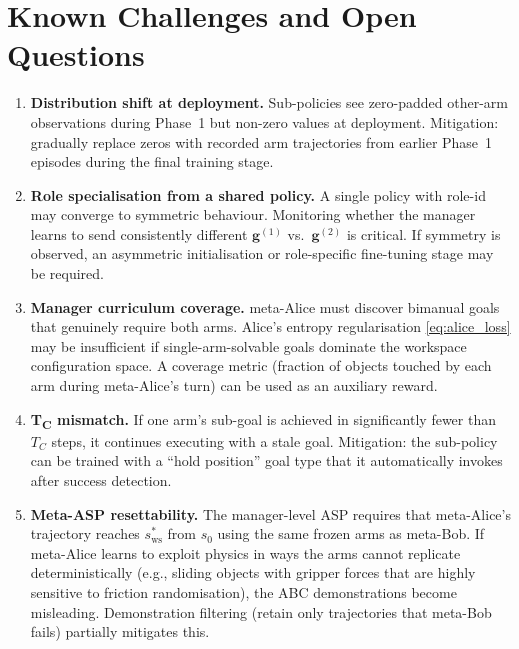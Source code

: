 \documentclass[12pt, a4paper]{article}
\newcommand{\sstar}{s^{*}}
\newcommand{\goalvec}{\mathbf{g}}
\begin{document}
\section{Known Challenges and Open Questions}
\label{sec:challenges}

\begin{enumerate}
    \item \textbf{Distribution shift at deployment.} Sub-policies see zero-padded
          other-arm observations during Phase~1 but non-zero values at deployment.
          Mitigation: gradually replace zeros with recorded arm trajectories from earlier
          Phase~1 episodes during the final training stage.

    \item \textbf{Role specialisation from a shared policy.} A single policy with role-id
          may converge to symmetric behaviour. Monitoring whether the manager learns to
          send consistently different $\goalvec^{(1)}$ vs.\ $\goalvec^{(2)}$ is critical.
          If symmetry is observed, an asymmetric initialisation or role-specific fine-tuning
          stage may be required.

    \item \textbf{Manager curriculum coverage.} meta-Alice must discover bimanual goals
          that genuinely require both arms. Alice's entropy regularisation
          \cref{eq:alice_loss} may be insufficient if single-arm-solvable goals dominate
          the workspace configuration space. A coverage metric (fraction of objects touched
          by each arm during meta-Alice's turn) can be used as an auxiliary reward.

    \item \textbf{T\textsubscript{C} mismatch.} If one arm's sub-goal is achieved in
          significantly fewer than $T_C$ steps, it continues executing with a stale goal.
          Mitigation: the sub-policy can be trained with a ``hold position'' goal type that
          it automatically invokes after success detection.

    \item \textbf{Meta-ASP resettability.} The manager-level ASP requires that
          meta-Alice's trajectory reaches $\sstar_{\mathrm{ws}}$ from $s_0$ using the
          same frozen arms as meta-Bob. If meta-Alice learns to exploit physics in ways
          the arms cannot replicate deterministically (e.g., sliding objects with gripper
          forces that are highly sensitive to friction randomisation), the ABC demonstrations
          become misleading. Demonstration filtering (retain only trajectories that meta-Bob
          fails) partially mitigates this.
\end{enumerate}
\end{document}
